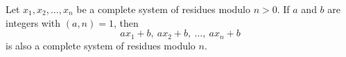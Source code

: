 Let $x_1, x_2, \ldots, x_n$ be a complete system of residues modulo $n > 0$. If $a$ and $b$ are integers with $(a, n) = 1$, then
$$a x_1 + b,\ a x_2 + b,\ \ldots,\ a x_n + b$$
is also a complete system of residues modulo $n$.
